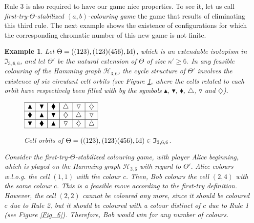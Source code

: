 \documentclass{article}
\newtheorem{example}[thm]{Example}
\begin{document}
\vspace{0.2cm}

Rule 3 is also required to have our game nice properties. To see it, let us call \emph{first-try-$\Theta$-stabilized $(a,b)$-colouring game} the game that results of eliminating this third rule. The next example shows the existence of configurations for which the corresponding chromatic number of this new game is not finite.

\begin{example}\label{firsttryexample} Let $\Theta=((123),(123)(456),{\rm Id})$, which is an extendable isotopism in $\mathfrak{I}_{3,6,6}$, and let $\Theta'$ be the natural extension 
of 
$\Theta$ of size $n'\ge 6$. In any feasible colouring of the Hamming graph $\mathcal{H}_{3,6}$, the cycle structure of $\Theta'$ involves the existence of six {\em circulant} cell orbits (see Figure \ref{Fig_5}, where the cells related to each orbit have respectively been filled with by the symbols $\blacktriangle$, $\blacktriangledown$, $\blacklozenge$, $\triangle$, $\triangledown$ and $\diamondsuit$).

\begin{figure}[htbp]
\begin{center}
$\begin{array}{|c|c|c|c|c|c|}
\hline
\blacktriangle&\blacktriangledown&\blacklozenge & \triangle & \triangledown & \diamondsuit\\
\hline
\blacklozenge&\blacktriangle&\blacktriangledown & \diamondsuit & \triangle & \triangledown\\
\hline
\blacktriangledown&\blacklozenge&\blacktriangle & \triangledown & \diamondsuit & \triangle\\
\hline
\end{array}$
\end{center}
\caption{Cell orbits of $\Theta=((123),(123)(456),{\rm Id})\in \mathfrak{I}_{3,6,6}$.}\label{Fig_5}
\end{figure}

Consider the first-try-$\Theta$-stabilized colouring game, with player Alice beginning, which is played on the Hamming graph $\mathcal{H}_{3,6}$ with regard to $\Theta'$. Alice 
colours 
w.l.o.g. the cell $(1,1)$ with the colour $c$. Then, Bob colours the cell $(2,4)$ with the same colour $c$. This is a feasible move according to the first-try definition. However, the cell $(2,2)$ cannot be coloured any more, since it should be coloured $c$ due to Rule 2, but it should be coloured with a colour distinct of $c$ due to Rule 1 (see Figure \ref{Fig_6}). Therefore, Bob would win for any number of colours.


\end{example}
\end{document}
